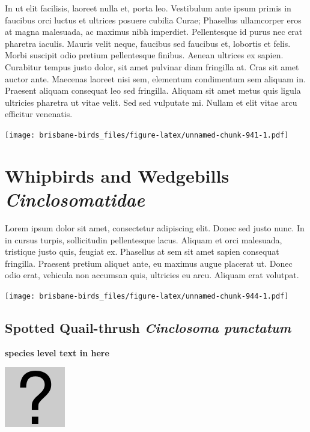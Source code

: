 \documentclass[]{book}
\let\origfigure\figure
\let\endorigfigure\endfigure
\renewenvironment{figure}[1][2] {
  \expandafter\origfigure\expandafter[H]
} {
  \endorigfigure
}
\begin{document}
In ut elit facilisis, laoreet nulla et, porta leo. Vestibulum ante ipsum
primis in faucibus orci luctus et ultrices posuere cubilia Curae;
Phasellus ullamcorper eros at magna malesuada, ac maximus nibh
imperdiet. Pellentesque id purus nec erat pharetra iaculis. Mauris velit
neque, faucibus sed faucibus et, lobortis et felis. Morbi suscipit odio
pretium pellentesque finibus. Aenean ultrices ex sapien. Curabitur
tempus justo dolor, sit amet pulvinar diam fringilla at. Cras sit amet
auctor ante. Maecenas laoreet nisi sem, elementum condimentum sem
aliquam in. Praesent aliquam consequat leo sed fringilla. Aliquam sit
amet metus quis ligula ultricies pharetra ut vitae velit. Sed sed
vulputate mi. Nullam et elit vitae arcu efficitur venenatis.

\begin{figure}
\centering
\texttt{[image: brisbane-birds\_files/figure-latex/unnamed-chunk-941-1.pdf]}
\caption{\label{fig:unnamed-chunk-941}insert figure caption}
\end{figure}

\chapter{\texorpdfstring{Whipbirds and Wedgebills
\emph{Cinclosomatidae}}{Whipbirds and Wedgebills Cinclosomatidae}}\label{whipbirds-and-wedgebills-cinclosomatidae}

Lorem ipsum dolor sit amet, consectetur adipiscing elit. Donec sed justo
nunc. In in cursus turpis, sollicitudin pellentesque lacus. Aliquam et
orci malesuada, tristique justo quis, feugiat ex. Phasellus at sem sit
amet sapien consequat fringilla. Praesent pretium aliquet ante, eu
maximus augue placerat ut. Donec odio erat, vehicula non accumsan quis,
ultricies eu arcu. Aliquam erat volutpat.

\texttt{[image: brisbane-birds\_files/figure-latex/unnamed-chunk-944-1.pdf]}

\section{\texorpdfstring{Spotted Quail-thrush \emph{Cinclosoma
punctatum}}{Spotted Quail-thrush Cinclosoma punctatum}}\label{spotted-quail-thrush-cinclosoma-punctatum}

\textbf{species level text in here}

\begin{figure}
\centering
\includegraphics{assets/missing.png}
\caption{No image for species}
\end{figure}
\end{document}
